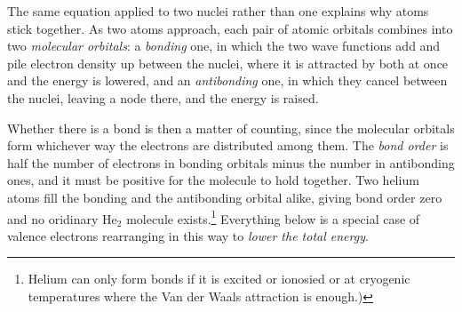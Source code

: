         The same equation applied to two nuclei rather than one explains why atoms stick together. As two atoms approach, each pair of atomic orbitals combines into two \emph{molecular orbitals}: a \emph{bonding} one, in which the two wave functions add and pile electron density up between the nuclei, where it is attracted by both at once and the energy is lowered, and an \emph{antibonding} one, in which they cancel between the nuclei, leaving a node there, and the energy is raised.

        Whether there is a bond is then a matter of counting, since the molecular orbitals form whichever way the electrons are distributed among them. The \emph{bond order} is half the number of electrons in bonding orbitals minus the number in antibonding ones, and it must be positive for the molecule to hold together. Two helium atoms fill the bonding and the antibonding orbital alike, giving bond order zero and no oridinary He$_{2}$ molecule exists.\footnote{
            Helium can only form bonds if it is excited or ionosied or at cryogenic temperatures where the Van der Waals attraction is enough.)
        } Everything below is a special case of valence electrons rearranging in this way to \emph{lower the total energy}.

